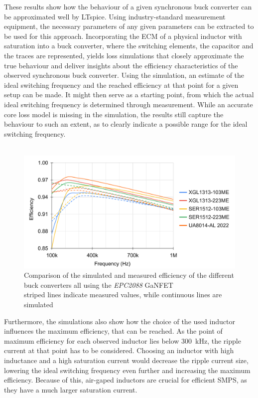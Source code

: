 These results show how the behaviour of a given synchronous buck converter can be approximated well by LTspice. Using industry-standard measurement equipment, the necessary parameters of any given parameters can be extracted to be used for this approach.
Incorporating the \ac{ECM} of a physical inductor with saturation into a buck converter, where the switching elements, the capacitor and the traces are represented, yields loss simulations that closely approximate the true behaviour and deliver insights about the efficiency characteristics of the observed synchronous buck converter. Using the simulation, an estimate of the ideal switching frequency and the reached efficiency at that point for a given setup can be made. It might then serve as a starting point, from which the actual ideal switching frequency is determined through measurement. While an accurate core loss model is missing in the simulation, the results still capture the behaviour to such an extent, as to clearly indicate a possible range for the ideal switching frequency.\\\\
\begin{figure}[h]
    \centering
    \includegraphics[width=.9\linewidth]{Bilder/Kapitel4/EPC2088_Inductor_Efficiency_Comparison_full.png}
    \caption{Comparison of the simulated and measured efficiency of the different buck converters all using the \textit{EPC2088} \ac{GaNFET} \\striped lines indicate measured values, while continuous lines are simulated}
    \label{fig:efficiency_simuilation_comparison}
\end{figure}
Furthermore, the simulations also show how the choice of the used inductor influences the maximum efficiency, that can be reached. As the point of maximum efficiency for each observed inductor lies below \SI{300}{\kilo\Hz}, the ripple current at that point has to be considered. Choosing an inductor with high inductance and a high saturation current would decrease the ripple current size, lowering the ideal switching frequency even further and increasing the maximum efficiency. Because of this, air-gaped inductors are crucial for efficient \ac{SMPS}, as they have a much larger saturation current.\\
